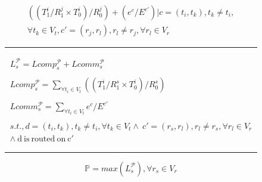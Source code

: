\documentclass[10pt, conference, compsocconf, reqno]{IEEEtran}
\begin{document}
\begin{figure}[ht!]
\begin{scriptsize}


  \begin{equation}
    \label{eq:3}
    \begin{array}{c}

      ((T^i_1/R^j_1\times T^i_0)/R^j_0)
      + (e^c/E^{c'}) | c = (t_i,t_k), t_k \neq t_i, \\ \forall t_k \in V_t, c' =
      (r_j,r_l), r_l \neq r_j, \forall r_l \in V_r

    \end{array}
  \end{equation}

  \rule{8.6cm}{0.4pt}

  \begin{equation}
    \label{eq:1}
    \begin{array}{c}
      L^{\mathcal{P}}_s = Lcomp^{\mathcal{P}}_s +
      Lcomm^{\mathcal{P}}_s\\
      \\Lcomp^{\mathcal{P}}_s =
      \sum_{\forall t_i \in V_t} ((T^i_1/R^s_1\times T^i_0)/R^s_0)\\
      \\Lcomm^{\mathcal{P}}_s =
      \sum_{\forall t_i \in V_t} e^c / E^{c'}\\
      \\s.t., d = (t_i,t_k), t_k \neq t_i, \forall t_k
      \in V_t \wedge\  c' = (r_s,r_l), r_l \neq r_s, \forall r_l \in V_r \\
      \wedge\ \mathrm{d\ is\ routed\ on\ c'}
    \end{array}
  \end{equation}

  \rule{8.6cm}{0.4pt}

  \begin{equation}
    \label{eq:2}
    \mathbb{P} = max ({L^{\mathcal{P}}_s}), \forall r_s \in V_r
  \end{equation}

\end{scriptsize}
\end{figure}
\end{document}
